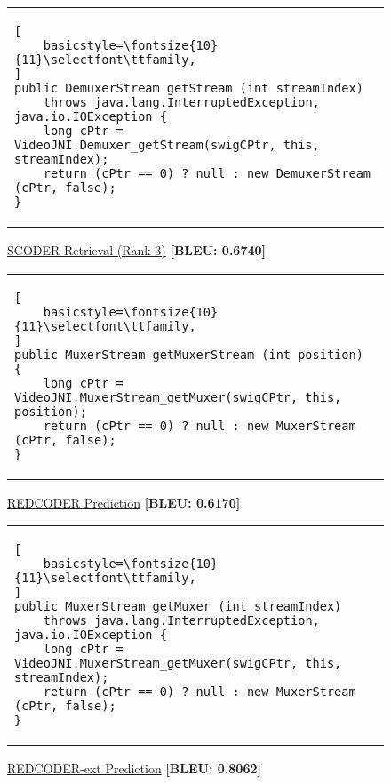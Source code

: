 \documentclass[11pt]{article}
\begin{document}
\begin{figure*}[t]
\begin{subfigure}{\textwidth}
\end{subfigure}
\vspace{5mm}
\begin{subfigure}{\textwidth}
\lstset{escapechar=@,style=CustomJava}
\captionsetup{font=large}
\caption{\underline{SCODER Retrieval (Rank-3)} {\bf[BLEU: 0.6740]}}
\begin{tabular}{l}
\lstset{escapechar=@,style=CustomJava}
\begin{lstlisting}[
    basicstyle=\fontsize{10}{11}\selectfont\ttfamily,
]
public DemuxerStream getStream (int streamIndex) 
    throws java.lang.InterruptedException, java.io.IOException {
    long cPtr = VideoJNI.Demuxer_getStream(swigCPtr, this, streamIndex);
    return (cPtr == 0) ? null : new DemuxerStream (cPtr, false);
}
\end{lstlisting}
\end{tabular}
\end{subfigure}
\vspace{5mm}
\begin{subfigure}{\textwidth}
\lstset{escapechar=@,style=CustomJava}
\captionsetup{font=large}
\caption{\underline{REDCODER Prediction} {\bf[BLEU: 0.6170]}}
\begin{tabular}{l}
\lstset{escapechar=@,style=CustomJava}
\begin{lstlisting}[
    basicstyle=\fontsize{10}{11}\selectfont\ttfamily,
]
public MuxerStream getMuxerStream (int position) {
    long cPtr = VideoJNI.MuxerStream_getMuxer(swigCPtr, this, position);
    return (cPtr == 0) ? null : new MuxerStream (cPtr, false);
}
\end{lstlisting}
\end{tabular}
\end{subfigure}
\vspace{5mm}
\begin{subfigure}{\textwidth}
\lstset{escapechar=@,style=CustomJava}
\captionsetup{font=large}
\caption{\underline{REDCODER-ext Prediction} {\bf[BLEU: 0.8062]}}
\begin{tabular}{l}
\lstset{escapechar=@,style=CustomJava}
\begin{lstlisting}[
    basicstyle=\fontsize{10}{11}\selectfont\ttfamily,
]
public MuxerStream getMuxer (int streamIndex) 
    throws java.lang.InterruptedException, java.io.IOException {
    long cPtr = VideoJNI.MuxerStream_getMuxer(swigCPtr, this, streamIndex);
    return (cPtr == 0) ? null : new MuxerStream (cPtr, false);
}
\end{lstlisting}
\end{tabular}

\end{subfigure}
\end{figure*}
\end{document}
